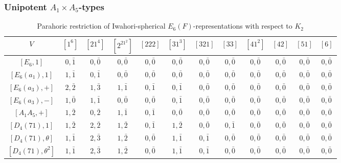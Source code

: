     \subsubsection*{Unipotent \texorpdfstring{$A_1\times A_5$}{PDFstring}-types}
    \begin{table}[ht]
        \centering
        \caption{Parahoric restriction of Iwahori-spherical $E_6(F)$-representations with respect to $K_2$}
        \label{tab:e6_a1a5_restriction_final}
        \begin{adjustbox}{max width=\linewidth}
        \begin{tabular}{|c|ccccccccccc|}
        \hline
        $V$ & $[1^6]$ & $[21^4]$ & $[2^21^2]$ & $[222]$ & $[31^3]$ & $[321]$ & $[33]$ & $[41^2]$ & $[42]$ & $[51]$ & $[6]$ \\ \hline
        $[E_6, 1]$             & $0, \bar{1}$ & $0, \bar{0}$ & $0, \bar{0}$ & $0, \bar{0}$ & $0, \bar{0}$ & $0, \bar{0}$ & $0, \bar{0}$ & $0, \bar{0}$ & $0, \bar{0}$ & $0, \bar{0}$ & $0, \bar{0}$ \\ \hline

        $[E_6(a_1), 1]$        & $1, \bar{1}$ & $0, \bar{1}$ & $0, \bar{0}$ & $0, \bar{0}$ & $0, \bar{0}$ & $0, \bar{0}$ & $0, \bar{0}$ & $0, \bar{0}$ & $0, \bar{0}$ & $0, \bar{0}$ & $0, \bar{0}$ \\ \hline

        $[E_6(a_3), +]$        & $2, \bar{2}$ & $1, \bar{3}$ & $1, \bar{1}$ & $0, \bar{1}$ & $0, \bar{1}$ & $0, \bar{0}$ & $0, \bar{0}$ & $0, \bar{0}$ & $0, \bar{0}$ & $0, \bar{0}$ & $0, \bar{0}$ \\
        $[E_6(a_3), -]$        & $1, \bar{0}$ & $1, \bar{1}$ & $0, \bar{0}$ & $0, \bar{0}$ & $0, \bar{1}$ & $0, \bar{0}$ & $0, \bar{0}$ & $0, \bar{0}$ & $0, \bar{0}$ & $0, \bar{0}$ & $0, \bar{0}$ \\
        $[A_1A_5, +]$          & $1, \bar{2}$ & $0, \bar{2}$ & $1, \bar{1}$ & $0, \bar{1}$ & $0, \bar{0}$ & $0, \bar{0}$ & $0, \bar{0}$ & $0, \bar{0}$ & $0, \bar{0}$ & $0, \bar{0}$ & $0, \bar{0}$ \\ \hline

        $[D_4(71), 1]$         & $1, \bar{2}$ & $2, \bar{2}$ & $1, \bar{2}$ & $0, \bar{1}$ & $1, \bar{2}$ & $0, \bar{0}$ & $0, \bar{1}$ & $0, \bar{0}$ & $0, \bar{0}$ & $0, \bar{0}$ & $0, \bar{0}$ \\
        $[D_4(71), \theta]$    & $1, \bar{1}$ & $2, \bar{3}$ & $1, \bar{2}$ & $0, \bar{0}$ & $1, \bar{1}$ & $0, \bar{1}$ & $0, \bar{0}$ & $0, \bar{0}$ & $0, \bar{0}$ & $0, \bar{0}$ & $0, \bar{0}$ \\
        $[D_4(71), \theta^2]$  & $1, \bar{1}$ & $2, \bar{3}$ & $1, \bar{2}$ & $0, \bar{0}$ & $1, \bar{1}$ & $0, \bar{1}$ & $0, \bar{0}$ & $0, \bar{0}$ & $0, \bar{0}$ & $0, \bar{0}$ & $0, \bar{0}$ \\ \hline
        

\end{tabular}
\end{adjustbox}
\end{table}
